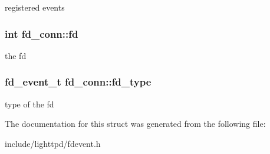 registered events \hypertarget{structfd__conn_576721c825a9faed73f007b6a9ed8d5f}{
\subsubsection[{fd}]{\setlength{\rightskip}{0pt plus 5cm}int {\bf fd\_\-conn::fd}}}
\label{structfd__conn_576721c825a9faed73f007b6a9ed8d5f}


the fd \hypertarget{structfd__conn_17c1513ada1c24eddf52b5e4654452d5}{
\subsubsection[{fd\_\-type}]{\setlength{\rightskip}{0pt plus 5cm}fd\_\-event\_\-t {\bf fd\_\-conn::fd\_\-type}}}
\label{structfd__conn_17c1513ada1c24eddf52b5e4654452d5}


type of the fd 

The documentation for this struct was generated from the following file:\begin{CompactItemize}
\item 
include/lighttpd/fdevent.h\end{CompactItemize}
